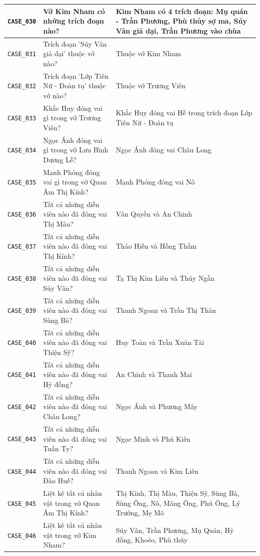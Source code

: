 \begin{longtable}{|p{1.9cm}|p{5.2cm}|p{7.3cm}|}
  \hline
  \texttt{CASE\_030} & Vở Kim Nham có những trích đoạn nào? & Kim Nham có 4 trích đoạn: Mụ quán - Trần Phương, Phù thủy sợ ma, Súy Vân giả dại, Trần Phương vào chùa \\
  \hline
  \texttt{CASE\_031} & Trích đoạn 'Súy Vân giả dại' thuộc vở nào? & Thuộc vở Kim Nham \\
  \hline
  \texttt{CASE\_032} & Trích đoạn 'Lớp Tiên Nữ - Đoàn tụ' thuộc vở nào? & Thuộc vở Trương Viên \\
  \hline
  \texttt{CASE\_033} & Khắc Huy đóng vai gì trong vở Trương Viên? & Khắc Huy đóng vai Hề trong trích đoạn Lớp Tiên Nữ - Đoàn tụ \\
  \hline
  \texttt{CASE\_034} & Ngọc Ánh đóng vai gì trong vở Lưu Bình Dương Lễ? & Ngọc Ánh đóng vai Châu Long \\
  \hline
  \texttt{CASE\_035} & Mạnh Phóng đóng vai gì trong vở Quan Âm Thị Kính? & Mạnh Phóng đóng vai Nô \\
  \hline
  \texttt{CASE\_036} & Tất cả những diễn viên nào đã đóng vai Thị Màu? & Vân Quyền và An Chinh \\
  \hline
  \texttt{CASE\_037} & Tất cả những diễn viên nào đã đóng vai Thị Kính? & Thảo Hiền và Hồng Thắm \\
  \hline
  \texttt{CASE\_038} & Tất cả những diễn viên nào đã đóng vai Súy Vân? & Tạ Thị Kim Liên và Thúy Ngần \\
  \hline
  \texttt{CASE\_039} & Tất cả những diễn viên nào đã đóng vai Sùng Bà? & Thanh Ngoan và Trần Thị Thân \\
  \hline
  \texttt{CASE\_040} & Tất cả những diễn viên nào đã đóng vai Thiện Sỹ? & Huy Toàn và Trần Xuân Tài \\
  \hline
  \texttt{CASE\_041} & Tất cả những diễn viên nào đã đóng vai Hỷ đồng? & An Chinh và Thanh Mai \\
  \hline
  \texttt{CASE\_042} & Tất cả những diễn viên nào đã đóng vai Châu Long? & Ngọc Ánh và Phương Mây \\
  \hline
  \texttt{CASE\_043} & Tất cả những diễn viên nào đã đóng vai Tuần Ty? & Ngọc Minh và Phú Kiên \\
  \hline
  \texttt{CASE\_044} & Tất cả những diễn viên nào đã đóng vai Đào Huế? & Thanh Ngoan và Kim Liên \\
  \hline
  \texttt{CASE\_045} & Liệt kê tất cả nhân vật trong vở Quan Âm Thị Kính? & Thị Kính, Thị Màu, Thiện Sỹ, Sùng Bà, Sùng Ông, Nô, Mãng Ông, Phú Ông, Lý Trưởng, Mẹ Mõ \\
  \hline
  \texttt{CASE\_046} & Liệt kê tất cả nhân vật trong vở Kim Nham? & Súy Vân, Trần Phương, Mụ Quán, Hỷ đồng, Khoèo, Phù thủy \\

\end{longtable}
